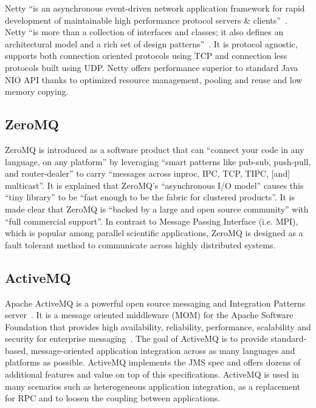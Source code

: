 Netty ``is an asynchronous event-driven network application framework
for rapid development of maintainable high performance protocol
servers \& clients''~\cite{www-netty}. Netty ``is more than a
collection of interfaces and classes; it also defines an architectural
model and a rich set of design patterns''~\cite{netty-book}. It is
protocol agnostic, supports both connection oriented protocols using
TCP and connection less protocols built using UDP. Netty offers
performance superior to standard Java NIO API thanks to optimized
resource management, pooling and reuse and low memory copying.

     \pv
     
\subsection{ZeroMQ}

     ZeroMQ is introduced as a software product
     that can ``connect your code in any language, on any platform'' by 
     leveraging ``smart patterns like pub-sub, push-pull, and 
     router-dealer'' to carry ``messages across inproc, IPC, TCP, TIPC, 
     [and] multicast''\cite{www-zeromq}. It is explained that
     ZeroMQ's ``asynchronous I/O model'' causes this ``tiny library'' to 
     be ``fast enough to be the fabric for clustered products''\cite{www-zeromq2}.
     It is made clear that ZeroMQ is ``backed by a
     large and open source community'' with ``full commercial
     support''\cite{www-zeromq}.
     In contrast to Message Passing Interface (i.e. MPI), which is 
     popular among parallel scientific applications, ZeroMQ is 
     designed as a fault tolerant method to communicate across highly 
     distributed systems.

     \pv

\subsection{ActiveMQ}

Apache ActiveMQ is a powerful open source messaging and Integration
Patterns server~\cite{www-activeMQ}. It is a message oriented
middleware (MOM) for the Apache Software Foundation that provides high
availability, reliability, performance, scalability and security for
enterprise messaging~\cite{ActiveMQ-book}. The goal of ActiveMQ is to
provide standard-based, message-oriented application integration
across as many languages and platforms as possible. ActiveMQ
implements the JMS spec and offers dozens of additional features and
value on top of this specifications. ActiveMQ is used in many
scenarios such as heterogeneous application integration, as a
replacement for RPC and to loosen the coupling between applications.
     
